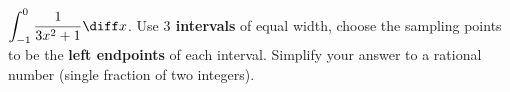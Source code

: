 \label{problemRiemannSum1/(3x^2+1)from-1to0with3intervalsLeftEndpt}
$\displaystyle\int_{-1}^0\frac{1}{3 {{x}}^{2}+1}\diff x
$. Use \textbf{$3$ intervals} of equal width, choose the sampling points to be the \textbf{left endpoints} of each interval. 
Simplify your answer to a rational number (single fraction of two integers).

